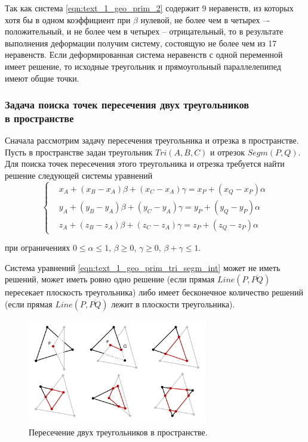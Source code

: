 Так как система \eqref{eqn:text_1_geo_prim_2} содержит 9 неравенств, из которых хотя бы в одном коэффициент при $\beta$ нулевой, не более чем в четырех –- положительный, и не более чем в четырех -- отрицательный, то в результате выполнения деформации получим систему, состоящую не более чем из 17 неравенств.
Если деформированная система неравенств с одной переменной имеет решение, то исходные треугольник и прямоугольный параллелепипед имеют общие точки.

\subsubsection{Задача поиска точек пересечения двух треугольников \\ в пространстве}\label{sec:text_1_geo_prim_tri_tri}

Сначала рассмотрим задачу пересечения треугольника и отрезка в пространстве.
Пусть в пространстве задан треугольник $Tri(A, B, C)$ и отрезок $Segm(P, Q)$.
Для поиска точек пересечения этого треугольника и отрезка требуется найти решение следующей системы уравнений
\begin{equation}\label{eqn:text_1_geo_prim_tri_segm_int}
	\left\{
		\begin{aligned}
			& x_A + (x_B - x_A) \beta + (x_C - x_A) \gamma = x_P + (x_Q - x_P) \alpha \\
			& y_A + (y_B - y_A) \beta + (y_C - y_A) \gamma = y_P + (y_Q - y_P) \alpha \\
			& z_A + (z_B - z_A) \beta + (z_C - z_A) \gamma = z_P + (z_Q - z_P) \alpha
		\end{aligned}
	\right.
\end{equation}

при ограничениях $0 \le \alpha \le 1$, $\beta \ge 0$, $\gamma \ge 0$, $\beta + \gamma \le 1$.

Система уравнений \eqref{eqn:text_1_geo_prim_tri_segm_int} может не иметь решений, может иметь ровно одно решение (если прямая $Line(P, \overline{PQ})$ пересекает плоскость треугольника) либо имеет бесконечное количество решений (если прямая $Line(P, \overline{PQ})$ лежит в плоскости треугольника).

\begin{figure}[ht]
\centering
\includegraphics[width=0.7\textwidth]{./pics/text_1_geo_prim/tri_tri.pdf}
\singlespacing
{}\caption{Пересечение двух треугольников в пространстве.}
\label{fig:text_1_geo_prim_tri_tri}
\end{figure}

